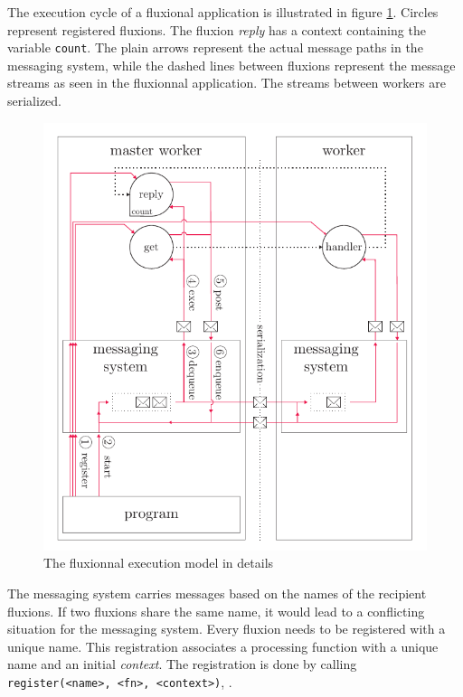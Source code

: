 The execution cycle of a fluxional application is illustrated in figure \ref{fig:MesSys}.
Circles represent registered fluxions.
The fluxion \textit{reply} has a context containing the variable \texttt{count}.
The plain arrows represent the actual message paths in the messaging system, while the dashed lines between fluxions represent the message streams as seen in the fluxionnal application.
The streams between workers are serialized.

\begin{figure}[h!]
  \includegraphics[width=\linewidth]{ressources/schema-message.pdf}
  \caption{The fluxionnal execution model in details}
  \label{fig:MesSys}
\end{figure}

The messaging system carries messages based on the names of the recipient fluxions.
If two fluxions share the same name, it would lead to a conflicting situation for the messaging system.
Every fluxion needs to be registered with a unique name.
This registration associates a processing function with a unique name and an initial \textit{context}.
The registration is done by calling \texttt{register(<name>, <fn>, <context>)}, .

